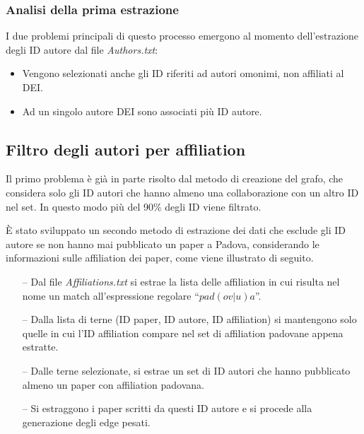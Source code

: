 \documentclass[12pt,a4paper,twoside]{report}
\begin{document}
%

\subsubsection{Analisi della prima estrazione}\label{ssc:analisiuno}

I due problemi principali di questo processo emergono al momento dell'estrazione degli ID autore dal
file \textit{Authors.txt}:

\begin{itemize}[noitemsep, topsep=0pt]
\item
Vengono selezionati anche gli ID riferiti ad autori omonimi, non affiliati al DEI.
\item
Ad un singolo autore DEI sono associati più ID autore.
\end{itemize}

\subsection{Filtro degli autori per affiliation} \label{ssc:padovani}
Il primo problema è già in parte risolto dal metodo di creazione del grafo, che considera solo gli
ID autori che hanno almeno una collaborazione con un altro ID nel set. In questo modo più del 90\%
degli ID viene filtrato.

È stato sviluppato un secondo metodo di estrazione dei dati che esclude gli ID autore se non hanno
mai pubblicato un paper a Padova, considerando le informazioni sulle affiliation dei paper, come
viene illustrato di seguito.

\begin{itemize}[noitemsep, topsep=0pt]
\item[--]
Dal file \textit{Affiliations.txt} si estrae la lista delle affiliation in cui risulta nel nome un match all'espressione regolare ``$pad(ov|u)a$''.
\item[--]
Dalla lista di terne (ID paper, ID autore, ID affiliation) si mantengono solo quelle in cui l'ID affiliation compare nel set di affiliation padovane appena estratte.
\item[--]
Dalle terne selezionate, si estrae un set di ID autori che hanno pubblicato almeno un paper con affiliation padovana.
\item[--] %
Si estraggono i paper scritti da questi ID autore e si procede alla generazione degli edge pesati.
\end{itemize}
\end{document}
